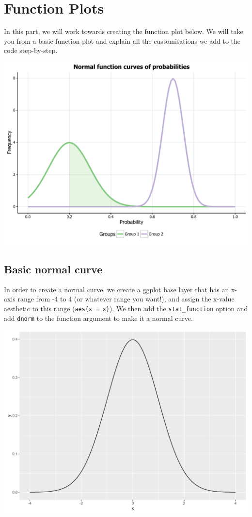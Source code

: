\chapter{Function Plots}\label{function-plots}

In this part, we will work towards creating the function plot below. We
will take you from a basic function plot and explain all the
customisations we add to the code step-by-step.

\begin{center}\includegraphics[width=0.55\linewidth]{figures/function_final-1} \end{center}

\section{Basic normal curve}\label{basic-normal-curve}

In order to create a normal curve, we create a ggplot base layer that
has an x-axis range from -4 to 4 (or whatever range you want!), and
assign the x-value aesthetic to this range (\texttt{aes(x\ =\ x)}). We
then add the \texttt{stat\_function} option and add \texttt{dnorm} to
the function argument to make it a normal curve.

\begin{Shaded}
\begin{Highlighting}[]
\StringTok{ }\NormalTok{(}\NormalTok{(} \NormalTok{(-}\NormalTok{, }\NormalTok{)), }\NormalTok{(} 
\StringTok{      }\NormalTok{(} 
\end{Highlighting}
\end{Shaded}

\begin{center}\includegraphics[width=0.55\linewidth]{figures/function_1-1} \end{center}

